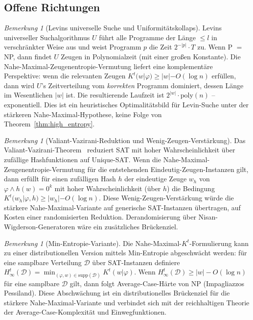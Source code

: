 \documentclass[aps,prd,twocolumn,superscriptaddress,nofootinbib]{revtex4-2}
\theoremstyle{definition}
\theoremstyle{remark}
\newtheorem{remark}[theorem]{Bemerkung}
\begin{document}
\subsection{Offene Richtungen}

\begin{remark}[Levins universelle Suche und Uniformitätskollaps]
\label{rem:levin-uniformity}
Levins universeller Suchalgorithmus $U$ führt alle Programme der Länge $\leq l$ in verschränkter Weise aus und weist Programm $p$ die Zeit $2^{-|p|} \cdot T$ zu. Wenn P $=$ NP, dann findet $U$ Zeugen in Polynomialzeit (mit einer großen Konstante). Die Nahe-Maximal-Zeugenentropie-Vermutung liefert eine komplementäre Perspektive: wenn die relevanten Zeugen $K^t(w|\varphi) \geq |w| - O(\log n)$ erfüllen, dann wird $U$'s Zeitverteilung vom \emph{korrekten} Programm dominiert, dessen Länge im Wesentlichen $|w|$ ist. Die resultierende Laufzeit ist $2^{|w|} \cdot \mathrm{poly}(n)$ -- exponentiell. Dies ist ein heuristisches Optimalitätsbild für Levin-Suche unter der stärkeren Nahe-Maximal-Hypothese, keine Folge von Theorem~\ref{thm:high_entropy}.
\end{remark}

\begin{remark}[Valiant-Vazirani-Reduktion und Wenig-Zeugen-Verstärkung]
\label{rem:valiant-vazirani}
Das Valiant-Vazirani-Theorem~\cite{ValiantVazirani1986} reduziert SAT mit hoher Wahrscheinlichkeit über zufällige Hashfunktionen auf Unique-SAT. Wenn die Nahe-Maximal-Zeugenentropie-Vermutung für die entstehenden Eindeutig-Zeugen-Instanzen gilt, dann erfüllt für einen zufälligen Hash $h$ der eindeutige Zeuge $w_h$ von $\varphi \wedge h(w) = 0^k$ mit hoher Wahrscheinlichkeit (über $h$) die Bedingung $K^t(w_h | \varphi, h) \geq |w_h| - O(\log n)$. Diese \glqq Wenig-Zeugen-Verstärkung\grqq{} würde die stärkere Nahe-Maximal-Variante auf generische SAT-Instanzen übertragen, auf Kosten einer randomisierten Reduktion. Derandomisierung über Nisan-Wigderson-Generatoren wäre ein zusätzliches Brückenziel.
\end{remark}

\begin{remark}[Min-Entropie-Variante]
\label{rem:min-entropy}
Die Nahe-Maximal-$K^t$-Formulierung kann zu einer distributionellen Version mittels Min-Entropie abgeschwächt werden: für eine samplbare Verteilung $\mathcal{D}$ über SAT-Instanzen definiere $H_\infty^t(\mathcal{D}) = \min_{(\varphi, w) \in \mathrm{supp}(\mathcal{D})} K^t(w | \varphi)$. Wenn $H_\infty^t(\mathcal{D}) \geq |w| - O(\log n)$ für eine samplbare $\mathcal{D}$ gilt, dann folgt Average-Case-Härte von NP (Impagliazzos \glqq Pessiland\grqq{}). Diese Abschwächung ist ein distributionelles Brückenziel für die stärkere Nahe-Maximal-Variante und verbindet sich mit der reichhaltigen Theorie der Average-Case-Komplexität und Einwegfunktionen.
\end{remark}
\end{document}
